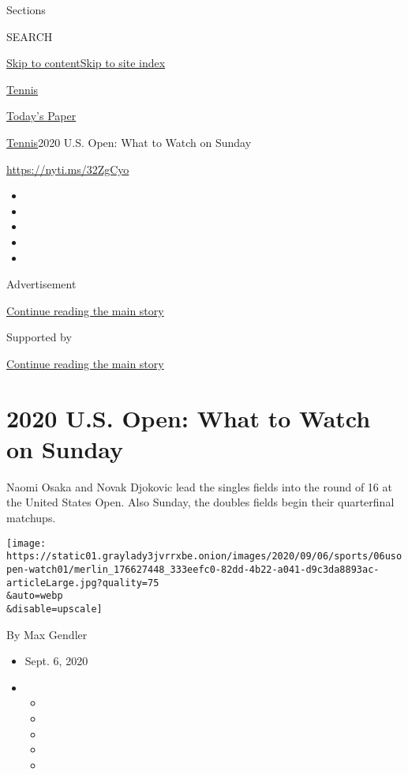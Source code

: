 Sections

SEARCH

\protect\hyperlink{site-content}{Skip to
content}\protect\hyperlink{site-index}{Skip to site index}

\href{https://www.nytimes3xbfgragh.onion/section/sports/tennis}{Tennis}

\href{https://myaccount.nytimes3xbfgragh.onion/auth/login?response_type=cookie\&client_id=vi}{}

\href{https://www.nytimes3xbfgragh.onion/section/todayspaper}{Today's
Paper}

\href{/section/sports/tennis}{Tennis}\textbar{}2020 U.S. Open: What to
Watch on Sunday

\url{https://nyti.ms/32ZgCyo}

\begin{itemize}
\item
\item
\item
\item
\item
\end{itemize}

Advertisement

\protect\hyperlink{after-top}{Continue reading the main story}

Supported by

\protect\hyperlink{after-sponsor}{Continue reading the main story}

\hypertarget{2020-us-open-what-to-watch-on-sunday}{%
\section{2020 U.S. Open: What to Watch on
Sunday}\label{2020-us-open-what-to-watch-on-sunday}}

Naomi Osaka and Novak Djokovic lead the singles fields into the round of
16 at the United States Open. Also Sunday, the doubles fields begin
their quarterfinal matchups.

\texttt{[image: https://static01.graylady3jvrrxbe.onion/images/2020/09/06/sports/06usopen-watch01/merlin\_176627448\_333eefc0-82dd-4b22-a041-d9c3da8893ac-articleLarge.jpg?quality=75\\\&auto=webp\\\&disable=upscale]}

By Max Gendler

\begin{itemize}
\item
  Sept. 6, 2020
\item
  \begin{itemize}
  \item
  \item
  \item
  \item
  \item
  \end{itemize}
\end{itemize}

